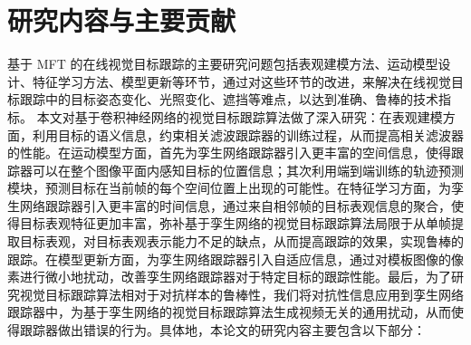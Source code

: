 \section{研究内容与主要贡献}
基于 MFT 的在线视觉目标跟踪的主要研究问题包括表观建模方法、运动模型设计、特征学习方法、模型更新等环节，通过对这些环节的改进，来解决在线视觉目标跟踪中的目标姿态变化、光照变化、遮挡等难点，以达到准确、鲁棒的技术指标。
本文对基于卷积神经网络的视觉目标跟踪算法做了深入研究：在表观建模方面，利用目标的语义信息，约束相关滤波跟踪器的训练过程，从而提高相关滤波器的性能。在运动模型方面，首先为孪生网络跟踪器引入更丰富的空间信息，使得跟踪器可以在整个图像平面内感知目标的位置信息；其次利用端到端训练的轨迹预测模块，预测目标在当前帧的每个空间位置上出现的可能性。在特征学习方面，为孪生网络跟踪器引入更丰富的时间信息，通过来自相邻帧的目标表观信息的聚合，使得目标表观特征更加丰富，弥补基于孪生网络的视觉目标跟踪算法局限于从单帧提取目标表观，对目标表观表示能力不足的缺点，从而提高跟踪的效果，实现鲁棒的跟踪。在模型更新方面，为孪生网络跟踪器引入自适应信息，通过对模板图像的像素进行微小地扰动，改善孪生网络跟踪器对于特定目标的跟踪性能。最后，为了研究视觉目标跟踪算法相对于对抗样本的鲁棒性，我们将对抗性信息应用到孪生网络跟踪器中，为基于孪生网络的视觉目标跟踪算法生成视频无关的通用扰动，从而使得跟踪器做出错误的行为。具体地，本论文的研究内容主要包含以下部分：
